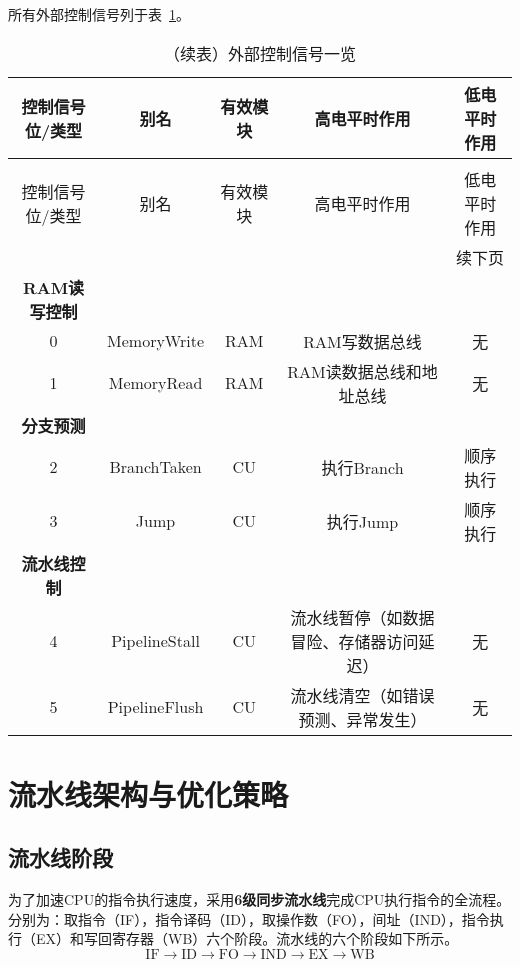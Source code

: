 \documentclass[lang=cn,a4paper,newtx]{elegantpaper}
\begin{document}
所有外部控制信号列于表~\ref{tab:CPU:ExternalControl}。
\begin{longtable}{c c c c c}
  \caption{外部控制信号一览} \label{tab:CPU:ExternalControl} \\
  \toprule
  控制信号位/类型 & 别名  & 有效模块 & 高电平时作用 & 低电平时作用\\
  \midrule
  \endfirsthead

  \caption[]{（续表）外部控制信号一览} \\
  \toprule
  控制信号位/类型 & 别名  & 有效模块 & 高电平时作用 & 低电平时作用 \\
  \midrule
  \endhead

  \midrule
  \multicolumn{5}{r}{续下页} \\
  \midrule
  \endfoot

  \bottomrule
  \endlastfoot
  \textbf{RAM读写控制}\\
  \hline
  0  & MemoryWrite    & RAM  & RAM写数据总线 & 无\\
  1  & MemoryRead     & RAM  & RAM读数据总线和地址总线 & 无\\
  \hline
  \textbf{分支预测} \\
  \hline
  2   & BranchTaken    & CU   & 执行Branch     & 顺序执行 \\
  3   & Jump            & CU  & 执行Jump        & 顺序执行 \\
  \hline
  \textbf{流水线控制}  \\
  \hline
  4   & PipelineStall & CU    & 流水线暂停（如数据冒险、存储器访问延迟） & 无 \\
  5   & PipelineFlush & CU    & 流水线清空（如错误预测、异常发生）      & 无 \\

\end{longtable}
\section{流水线架构与优化策略}
\subsection{流水线阶段}
为了加速CPU的指令执行速度，采用\textbf{6级同步流水线}完成CPU执行指令的全流程。分别为：取指令（IF），指令译码（ID），取操作数（FO），间址（IND），指令执行（EX）和写回寄存器（WB）六个阶段。流水线的六个阶段如下所示。
$$
  \text{IF} \rightarrow \text{ID} \rightarrow \text{FO}\rightarrow \text{IND} \rightarrow \text{EX} \rightarrow \text{WB}
$$
\end{document}
